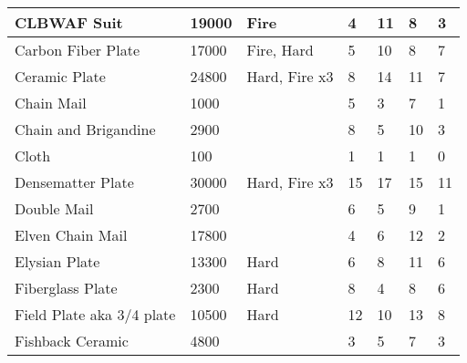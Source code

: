 \documentclass[twoside]{book}
\begin{document}
\begin{longtable}{p{1.25in}llp{2em}p{2em}p{2em}p{2em}}
  \raggedright
           CLBWAF Suit 
  &
   19000 
  &
   Fire 
  &
   4 
  &
   11 
  &
   8 
  &
   3 
  \tabularnewline
  \hline
      
  \raggedright
           Carbon Fiber Plate 
  &
   17000 
  &
   Fire, Hard 
  &
   5 
  &
   10 
  &
   8 
  &
   7 
  \tabularnewline
  \hline
      
  \raggedright
           Ceramic Plate 
  &
   24800 
  &
   Hard, Fire x3 
  &
   8 
  &
   14 
  &
   11 
  &
   7 
  \tabularnewline
  \hline
      
  \raggedright
           Chain Mail 
  &
   1000 
  &
  
  &
   5 
  &
   3 
  &
   7 
  &
   1 
  \tabularnewline
  \hline
      
  \raggedright
           Chain and Brigandine 
  &
   2900 
  &
  
  &
   8 
  &
   5 
  &
   10 
  &
   3 
  \tabularnewline
  \hline
      
  \raggedright
           Cloth 
  &
   100 
  &
  
  &
   1 
  &
   1 
  &
   1 
  &
   0 
  \tabularnewline
  \hline
      
  \raggedright
           Densematter Plate 
  &
   30000 
  &
   Hard, Fire x3 
  &
   15 
  &
   17 
  &
   15 
  &
   11 
  \tabularnewline
  \hline
      
  \raggedright
           Double Mail 
  &
   2700 
  &
  
  &
   6 
  &
   5 
  &
   9 
  &
   1 
  \tabularnewline
  \hline
      
  \raggedright
           Elven Chain Mail 
  &
   17800 
  &
  
  &
   4 
  &
   6 
  &
   12 
  &
   2 
  \tabularnewline
  \hline
      
  \raggedright
           Elysian Plate 
  &
   13300 
  &
   Hard 
  &
   6 
  &
   8 
  &
   11 
  &
   6 
  \tabularnewline
  \hline
      
  \raggedright
           Fiberglass Plate 
  &
   2300 
  &
   Hard 
  &
   8 
  &
   4 
  &
   8 
  &
   6 
  \tabularnewline
  \hline
      
  \raggedright
           Field Plate aka 3/4 plate
           
  &
   10500 
  &
   Hard 
  &
   12 
  &
   10 
  &
   13 
  &
   8 
  \tabularnewline
  \hline
      
  \raggedright
           Fishback Ceramic 
  &
   4800 
  &
  
  &
   3 
  &
   5 
  &
   7 
  &
   3 
  \tabularnewline
  \hline
      

\end{longtable}
\end{document}
